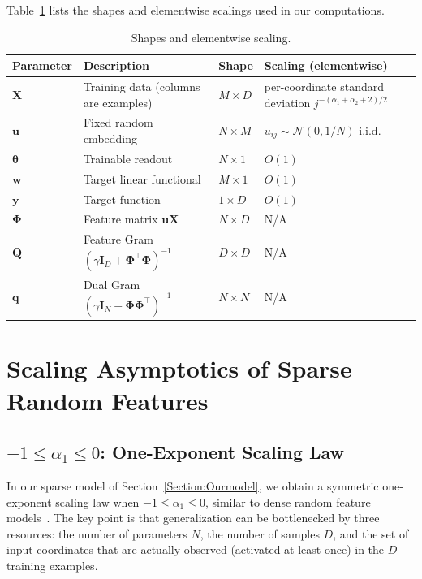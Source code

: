 \documentclass[11pt]{article}
\renewcommand{\arraystretch}{2}
\theoremstyle{plain}
\theoremstyle{definition}
\theoremstyle{remark}
\begin{document}
Table~\ref{tab:matrixTable2} lists the shapes and elementwise scalings used in our computations.
\begin{table}[h]
\vspace{-3mm}
\caption{Shapes and elementwise scaling.}
\label{tab:matrixTable2}
\small
\setlength{\tabcolsep}{4pt}
\renewcommand{\arraystretch}{1.15}
\begin{tabularx}{\columnwidth}{
  >{\hsize=0.3\hsize\centering\arraybackslash}X
  >{\hsize=1.7\hsize\centering\arraybackslash}X
  >{\hsize=0.3\hsize\centering\arraybackslash}X
  >{\hsize=1.7\hsize\centering\arraybackslash}X
}
\toprule
Parameter & Description & Shape & Scaling (elementwise) \\
\midrule
$\mathbf{X}$ & Training data (columns are examples) & $M\times D$ & per-coordinate standard deviation $j^{-(\alpha_1+\alpha_2+2)/2}$ \\
$\mathbf{u}$ & Fixed random embedding & $N\times M$ & $u_{ij}\sim\mathcal{N}(0,1/N)$ i.i.d. \\
$\boldsymbol{\theta}$ & Trainable readout & $N\times 1$ & $O(1)$ \\
$\mathbf{w}$ & Target linear functional & $M\times 1$ & $O(1)$ \\
$\mathbf{y}$ & Target function & $1\times D$ & $O(1)$ \\
$\boldsymbol{\Phi}$ & Feature matrix $\mathbf{u}\mathbf{X}$ & $N\times D$ & N/A \\
$\mathbf{Q}$       & Feature Gram $(\gamma\mathbf{I}_D + \boldsymbol{\Phi}^{\top}\boldsymbol{\Phi})^{-1}$ & $D\times D$ & N/A\\
$\mathbf{q}$       & Dual Gram $(\gamma\mathbf{I}_N + \boldsymbol{\Phi}\boldsymbol{\Phi}^{\top})^{-1}$ & $N\times N$ & N/A\\
\bottomrule
\end{tabularx}
\vspace{-2mm}
\end{table}


\section{Scaling Asymptotics of Sparse Random Features}\label{App:Scaling}

\subsection{$-1\le \alpha_1 \le 0$: One-Exponent Scaling Law}\label{app:weak-sparsity}

In our sparse model of Section~\ref{Section:Ourmodel}, we obtain a symmetric one-exponent scaling law when $-1\le \alpha_1 \le 0$, similar to dense random feature models~\citep{Bahri2021ExplainingScaling, Maloney2022SolvableScaling}. The key point is that generalization can be bottlenecked by three resources: the number of parameters $N$, the number of samples $D$, and the set of input coordinates that are actually observed (activated at least once) in the $D$ training examples.
\end{document}
